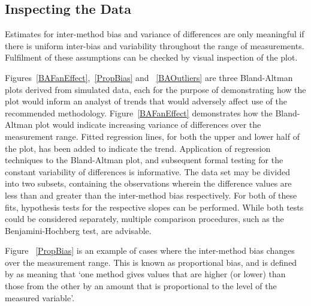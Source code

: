 \documentclass[12pt, a4paper]{report}
\theoremstyle{plain}
\theoremstyle{definition}
\theoremstyle{remark}
\begin{document}
	\subsection{Inspecting the Data}

Estimates for inter-method bias and variance of differences are only meaningful if there is uniform inter-bias and variability throughout the range of measurements. Fulfilment of these assumptions can be checked by visual inspection of the plot.

	
	Figures~\ref{BAFanEffect},~\ref{PropBias} and ~\ref{BAOutliers} are three Bland-Altman plots derived from
	simulated data, each for the purpose of demonstrating how the plot would inform an analyst of trends that would adversely affect use of the recommended methodology. Figure~\ref{BAFanEffect} demonstrates how the Bland-Altman plot would indicate
	increasing variance of differences over the measurement range.
	Fitted regression lines, for both the upper and lower half of the	plot, has been added to indicate the trend. Application of regression techniques to the Bland-Altman plot, and subsequent formal testing for the constant variability of differences is informative. The data set may be divided into two subsets, containing the observations wherein the difference values are less than and greater than the inter-method bias respectively. For both of these fits, hypothesis tests for the respective slopes can be performed. While both tests could be considered separately, multiple comparison procedures, such as the Benjamini-Hochberg \citep{BH} test, are advisable.
	
	Figure ~\ref{PropBias} is an example
	of cases where the inter-method bias changes over the measurement range. This is known as proportional bias, and is defined by \citet{ludbrook97} as meaning that `one method gives
	values that are higher (or lower) than those from the other by an
	amount that is proportional to the level of the measured variable'.
	
\end{document}
